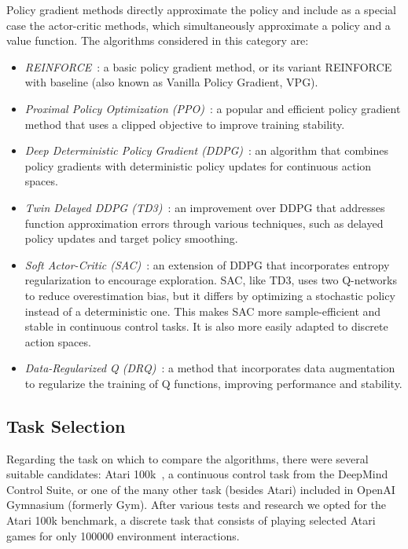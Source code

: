 Policy gradient methods directly approximate the policy and include as a special case the actor-critic methods, which simultaneously approximate a policy and a value function. The algorithms considered in this category are:
\begin{itemize}
	\item \textit{REINFORCE}~\cite[Chapter~13]{sutton:rl}: a basic policy gradient method, or its variant REINFORCE with baseline (also known as Vanilla Policy Gradient, VPG).
	\item \textit{Proximal Policy Optimization (PPO)}~\cite{schulman:ppo}: a popular and efficient policy gradient method that uses a clipped objective to improve training stability.
	\item \textit{Deep Deterministic Policy Gradient (DDPG)}~\cite{lillicrap:ddpg}: an algorithm that combines policy gradients with deterministic policy updates for continuous action spaces.
	\item \textit{Twin Delayed DDPG (TD3)~}\cite{fujimoto:td3}: an improvement over DDPG that addresses function approximation errors through various techniques, such as delayed policy updates and target policy smoothing.
	\item \textit{Soft Actor-Critic (SAC)}~\cite{haarnoja:sac}: an extension of DDPG that incorporates entropy regularization to encourage exploration. SAC, like TD3, uses two Q-networks to reduce overestimation bias, but it differs by optimizing a stochastic policy instead of a deterministic one. This makes SAC more sample-efficient and stable in continuous control tasks. It is also more easily adapted to discrete action spaces.
	\item \textit{Data-Regularized Q (DRQ)}~\cite{kostrikov:drq}: a method that incorporates data augmentation to regularize the training of Q functions, improving performance and stability.
\end{itemize}


\subsection{Task Selection}
\label{subsec:task_selection}

Regarding the task on which to compare the algorithms, there were several suitable candidates: Atari 100k~\cite{kaiser:atari100k}, a continuous control task from the DeepMind Control Suite, or one of the many other task (besides Atari) included in OpenAI Gymnasium (formerly Gym). After various tests and research we opted for the Atari 100k benchmark, a discrete task that consists of playing selected Atari games for only \num{100000} environment interactions.

